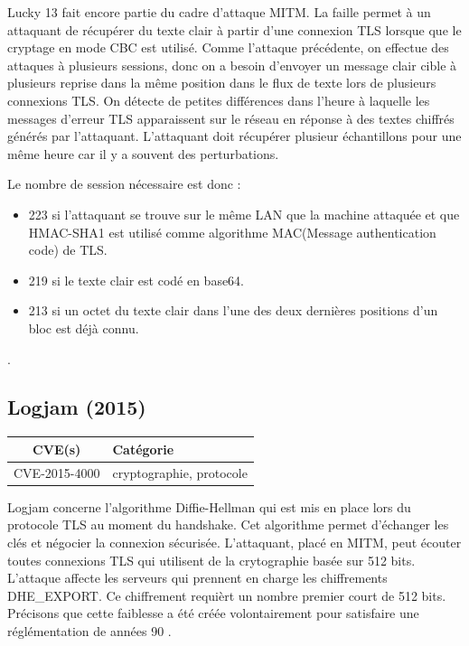 \vspace{1em}

Lucky 13 fait encore partie du cadre d'attaque MITM. La faille permet à un attaquant de récupérer du texte clair à partir d'une connexion TLS lorsque que le cryptage en mode CBC est utilisé. Comme l'attaque précédente, on effectue des attaques à plusieurs sessions, donc on a besoin d'envoyer un message clair cible à plusieurs reprise dans la même position dans le flux de texte lors de plusieurs connexions TLS. On détecte de petites différences dans l'heure à laquelle les messages d'erreur TLS apparaissent sur le réseau en réponse à des textes chiffrés générés par l'attaquant. L'attaquant doit récupérer plusieur échantillons pour une même heure car il y a souvent des perturbations.

Le nombre de session nécessaire est donc :

\begin{itemize}
\item 223 si l'attaquant se trouve sur le même LAN que la machine attaquée et que HMAC-SHA1 est utilisé comme algorithme MAC(Message authentication code) de TLS.
\item 219 si le texte clair est codé en base64.
\item 213 si un octet du texte clair dans l'une des deux dernières positions d'un bloc est déjà connu.
\end{itemize}
\cite{lucky13}.




\subsection{Logjam (2015)}

\begin{tabularx}{0.96\textwidth}{|c|X|}
  \hline
  \textbf{CVE(s)} & \textbf{Catégorie} \\
  \hline
  CVE-2015-4000 & cryptographie, protocole \\
  \hline
\end{tabularx}

\vspace{1em}

Logjam concerne l'algorithme Diffie-Hellman qui est mis en place lors du protocole TLS au moment du handshake. Cet algorithme permet d'échanger les clés et négocier la connexion sécurisée. L'attaquant, placé en MITM, peut écouter toutes connexions TLS qui utilisent de la crytographie basée sur 512 bits. L'attaque affecte les serveurs qui prennent en charge les chiffrements DHE\_EXPORT. Ce chiffrement requièrt un nombre premier court de 512 bits. Précisons que cette faiblesse a été créée volontairement pour satisfaire une réglémentation de années 90
\cite{logjam}.


